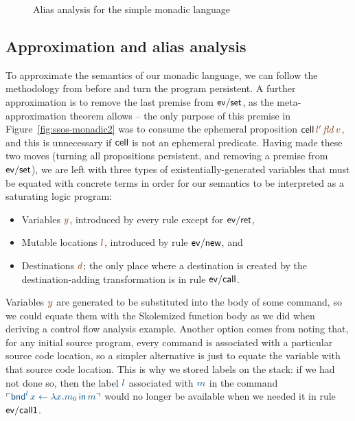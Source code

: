 \begin{figure}
\caption{Alias analysis for the simple monadic language}
\label{fig:ssos-monadic-approx}
\end{figure}



\subsection{Approximation and alias analysis}


To approximate the semantics of our monadic language, we can follow the
methodology from before and turn the program persistent. A further
approximation is to remove the last premise from ${\sf ev/set}$, as
the meta-approximation theorem allows -- the only purpose of this
premise in Figure~\ref{fig:ssos-monadic2} was to consume the ephemeral
proposition ${\sf cell}\,\lf{l'}\,\lf{\it fld}\,\lf{v}$, and this is unnecessary
if ${\sf cell}$ is not an ephemeral predicate.  Having
made these two moves (turning all propositions persistent, and removing
a premise from ${\sf ev/set}$), we are left with three types of
existentially-generated variables that must be equated with concrete
terms in order for our semantics to be interpreted as a saturating
logic program:

\smallskip
\begin{itemize}
\item Variables $\lf{y}$, introduced by every rule except for ${\sf ev/ret}$,
\item Mutable locations $\lf{l}$, introduced by rule ${\sf ev/new}$, and 
\item Destinations $\lf{d}$; the only place where a destination is created
by the destination-adding transformation is in rule ${\sf ev/call}$.
\end{itemize}
\smallskip

Variables $\lf{y}$ are generated to be substituted into the body of some
command, so we could equate them with the Skolemized function body as
we did when deriving a control flow analysis example. Another option
comes from noting that, for any initial source program, every command
is associated with a particular source code location, so a simpler
alternative is just to equate the variable with that source code
location. This is why we stored labels on the stack: if we had not
done so, then the label $\obj{l}$ associated with $\obj{m}$ in the command
$\interp{{\sf bnd}^l\, x \leftarrow \lambda x.m_0 \,{\sf in}\,m}$ would
no longer be available when we needed it in rule ${\sf ev/call1}$.

